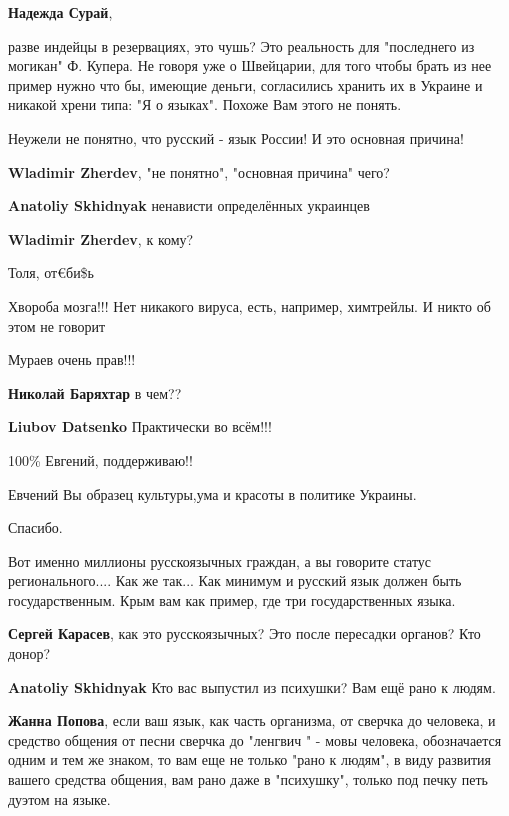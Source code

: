 \begin{itemize}
\begin{itemize}
\textbf{Надежда Сурай}, 

разве индейцы в резервациях, это чушь? Это реальность для "последнего из
могикан" Ф. Купера. Не говоря уже о Швейцарии, для того чтобы брать из нее
пример нужно что бы, имеющие деньги, согласились хранить их в Украине и никакой
хрени типа: "Я о языках". Похоже Вам этого не понять.

Неужели не понятно, что русский - язык России! И это основная причина!

\textbf{Wladimir Zherdev}, "не понятно", "основная причина" чего?

\textbf{Anatoliy Skhidnyak} ненависти определённых украинцев

\textbf{Wladimir Zherdev}, к кому?

Толя, от€би\$ь
\end{itemize} %

Хвороба мозга!!! Нет никакого вируса, есть, например, химтрейлы. И никто об этом не говорит

Мураев очень прав!!!

\begin{itemize} %
\textbf{Николай Баряхтар} в чем??

\textbf{Liubov Datsenko} Практически во всём!!!
\end{itemize} %

100\% Евгений, поддерживаю!!

Евчений Вы образец культуры,ума и красоты в политике Украины.

Спасибо.


Вот именно миллионы русскоязычных граждан, а вы говорите статус
регионального.... Как же так... Как минимум и русский язык должен быть
государственным. Крым вам как пример, где три государственных языка.

\begin{itemize} %
\textbf{Сергей Карасев}, как это русскоязычных? Это после пересадки органов? Кто донор?

\textbf{Anatoliy Skhidnyak}
Кто вас выпустил из психушки? Вам ещё рано к людям.

\textbf{Жанна Попова}, если ваш язык, как часть организма, от сверчка до человека, и средство общения от песни сверчка до "ленгвич " - мовы человека, обозначается одним и тем же знаком, то вам еще не только "рано к людям", в виду развития вашего средства общения, вам рано даже в "психушку", только под печку петь дуэтом на языке.


\end{itemize}
\end{itemize}
